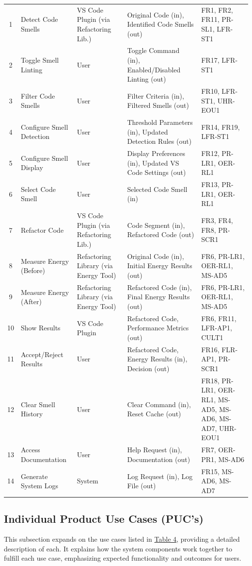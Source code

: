 \documentclass[12pt]{article}
\begin{document}
\begin{longtable}{|c|
    >{\raggedright\arraybackslash}p{1.5in}|  %
    >{\raggedright\arraybackslash}p{1in}|
    >{\raggedright\arraybackslash}p{1.8in}|
  >{\raggedright\arraybackslash}p{1.1in}|}
  1 & Detect Code Smells & VS Code Plugin (via Refactoring Lib.) &
  Original Code (in), Identified Code Smells (out) & FR1, FR2, FR11,
  PR-SL1, LFR-ST1 \\
  2 & Toggle Smell Linting & User & Toggle Command (in),
  Enabled/Disabled Linting (out) & FR17, LFR-ST1  \\
  3 & Filter Code Smells & User & Filter Criteria (in), Filtered
  Smells (out) & FR10, LFR-ST1, UHR-EOU1 \\
  4 & Configure Smell Detection & User & Threshold Parameters (in),
  Updated Detection Rules (out) & FR14, FR19, LFR-ST1 \\
  5 & Configure Smell Display & User & Display Preferences (in),
  Updated VS Code Settings (out) & FR12, PR-LR1, OER-RL1 \\
  6 & Select Code Smell & User & Selected Code Smell (in) & FR13,
  PR-LR1, OER-RL1\\
  7 & Refactor Code & VS Code Plugin (via Refactoring Lib.) & Code
  Segment (in), Refactored Code (out) & FR3, FR4, FR8, PR-SCR1 \\
  8 & Measure Energy (Before) & Refactoring Library (via Energy Tool)
  & Original Code (in), Initial Energy Results (out) & FR6, PR-LR1,
  OER-RL1, MS-AD5 \\
  9 & Measure Energy (After) & Refactoring Library (via Energy Tool)
  & Refactored Code (in), Final Energy Results (out) & FR6, PR-LR1,
  OER-RL1, MS-AD5 \\
  10 & Show Results & VS Code Plugin & Refactored Code, Performance
  Metrics (out) & FR6, FR11, LFR-AP1, CULT1 \\
  11 & Accept/Reject Results & User & Refactored Code, Energy Results
  (in), Decision (out) & FR16, FLR-AP1, PR-SCR1 \\
  12 & Clear Smell History & User & Clear Command (in), Reset Cache
  (out) & FR18, PR-LR1, OER-RL1, MS-AD5, MS-AD6, MS-AD7, UHR-EOU1 \\
  13 & Access Documentation & User & Help Request (in), Documentation
  (out) & FR7, OER-PR1, MS-AD6 \\
  14 & Generate System Logs & System & Log Request (in), Log File
  (out) & FR15, MS-AD6, MS-AD7 \\
\end{longtable}

\subsection{Individual Product Use Cases (PUC's)}
This subsection expands on the use cases listed in
\hyperref[tab:puc]{Table 4}, providing a detailed description of
each. It explains how the system components work together to fulfill
each use case, emphasizing expected functionality and outcomes for users.
\end{document}
